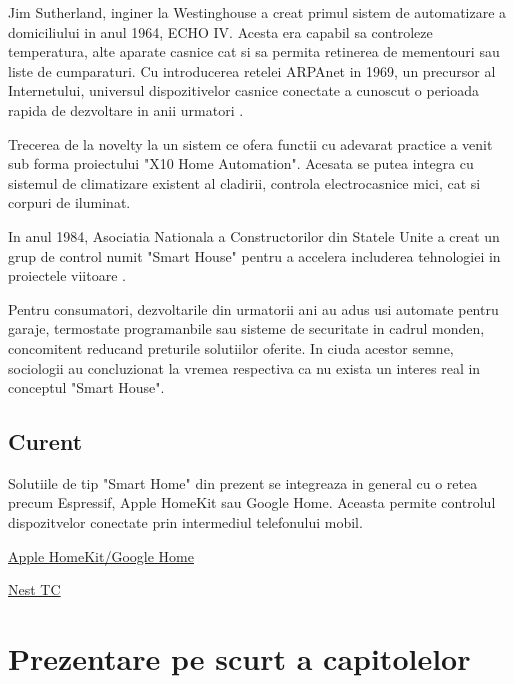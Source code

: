 Jim Sutherland, inginer la Westinghouse a creat primul sistem de automatizare a domiciliului in anul 1964, ECHO IV. Acesta era capabil sa controleze temperatura, alte aparate casnice cat si sa permita retinerea de mementouri sau liste de cumparaturi. Cu introducerea retelei ARPAnet in 1969, un precursor al Internetului, universul dispozitivelor casnice conectate a cunoscut o perioada rapida de dezvoltare in anii urmatori \cite{ZeusIntegratedSystems}.

Trecerea de la novelty la un sistem ce ofera functii cu adevarat practice a venit sub forma proiectului "X10 Home Automation". Acesata se putea integra cu sistemul de climatizare existent al cladirii, controla electrocasnice mici, cat si corpuri de iluminat.

In anul 1984, Asociatia Nationala a Constructorilor din Statele Unite a creat un grup de control numit "Smart House" pentru a accelera includerea tehnologiei in proiectele viitoare \cite{Aldrich2003Smart}.

Pentru consumatori, dezvoltarile din urmatorii ani au adus usi automate pentru garaje, termostate programanbile sau sisteme de securitate in cadrul monden, concomitent reducand preturile solutiilor oferite. In ciuda acestor semne, sociologii au concluzionat la vremea respectiva ca nu exista un interes real in conceptul "Smart House".

\subsection {Curent}

Solutiile de tip "Smart Home" din prezent se integreaza in general cu o retea precum Espressif, Apple HomeKit sau Google Home. Aceasta permite controlul dispozitvelor conectate prin intermediul telefonului mobil.

\href{https://www.familyhandyman.com/article/the-history-of-smart-home-technology/}{Apple HomeKit/Google Home}

\href{https://techcrunch.com/2013/05/11/from-the-garage-to-200-employees-in-3-years-how-nest-thermostats-were-born/}{Nest TC}


\section {Prezentare pe scurt a capitolelor}

